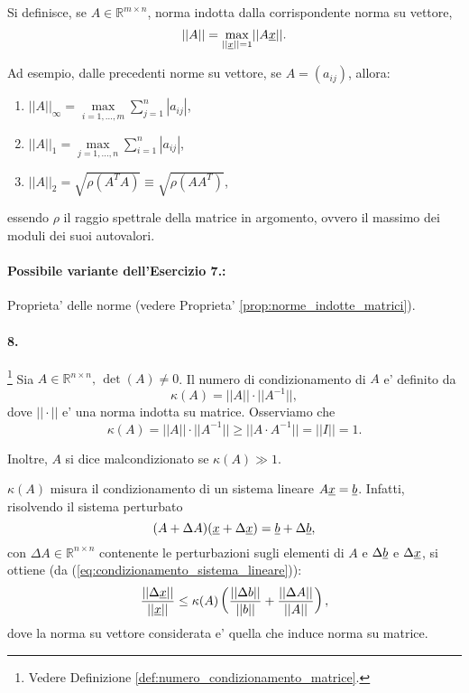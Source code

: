 Si definisce, se $A\in\mathbb{R}^{m\times n}$, norma indotta dalla corrispondente norma su vettore,
\begin{equation*}
	||A|| = \underset{||\uline x|| = 1}{\max}||A \uline x||.
\end{equation*}

Ad esempio, dalle precedenti norme su vettore, se $A=(a_{ij})$, allora:
\begin{enumerate}
	\item $||A||_\infty = \underset{i = 1, \hdots, m}{\max} \sum_{j=1}^{n}|a_{ij}|$,
	\item $||A||_1 = \underset{j = 1,\hdots, n}{\max}\sum_{i = 1}^{n}|a_{ij}|$,
	\item $||A||_2 =\sqrt{\rho(A^T A)} \equiv \sqrt{\rho (AA^T)}$,
\end{enumerate}
essendo $\rho$ il raggio spettrale della matrice in argomento, ovvero il massimo dei moduli dei suoi autovalori.

\paragraph{Possibile variante dell'Esercizio 7.:} Proprieta' delle norme (vedere Proprieta' \ref{prop:norme_indotte_matrici}).

\paragraph{8.}\footnote{Vedere Definizione \ref{def:numero_condizionamento_matrice}.} Sia $A\in\mathbb{R}^{n\times n},\, \det(A) \neq 0$. Il numero di condizionamento di $A$ e' definito da
\begin{equation*}
	\kappa(A) = ||A||\cdot||A^{-1}||,
\end{equation*}
dove $||\cdot||$ e' una norma indotta su matrice. Osserviamo che
\begin{equation*}
	\kappa(A) = ||A||\cdot||A^{-1}|| \geq ||A\cdot A^{-1}|| = ||I|| = 1.
\end{equation*}

Inoltre, $A$ si dice malcondizionato se $\kappa(A)\gg 1$.

$\kappa(A)$ misura il condizionamento di un sistema lineare $A\uline x = \uline b$. Infatti, risolvendo il sistema perturbato
\begin{equation*}
	(A+\Delta A) (\uline x + \Delta\uline x) = \uline b + \Delta\uline b,
\end{equation*}
con $\Delta A\in\mathbb{R}^{n\times n}$ contenente le perturbazioni sugli elementi di $A$ e $\Delta\uline b$ e $\Delta\uline x$, si ottiene (da (\ref{eq:condizionamento_sistema_lineare})):
\begin{equation*}
	 \frac{||\Delta \uline x||}{||\uline x||} \leq \kappa(A)\left(\frac{||\Delta b||}{||b||} + \frac{||\Delta A||}{||A||}\right),
\end{equation*}
dove la norma su vettore considerata e' quella che induce norma su matrice.

